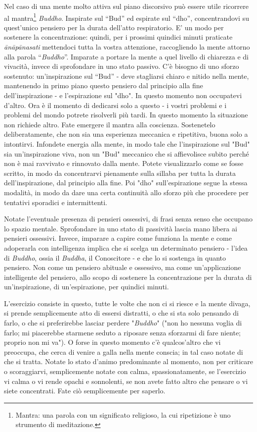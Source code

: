 
Nel caso di una mente molto attiva sul piano discorsivo può essere utile
ricorrere al mantra\footnote{Mantra: una parola con un significato religioso, la cui
ripetizione è uno strumento di meditazione.} \textit{Buddho}. Inspirate sul “Bud” ed espirate
sul “dho”, concentrandovi su quest'unico pensiero per la durata
dell'atto respiratorio. E' un modo per sostenere la concentrazione:
quindi, per i prossimi quindici minuti praticate \textit{ānāpānasati} mettendoci
tutta la vostra attenzione, raccogliendo la mente attorno alla parola
“\textit{Buddho}”. Imparate a portare la mente a quel livello di chiarezza e di
vivacità, invece di sprofondare in uno stato passivo. C'è bisogno di uno
sforzo sostenuto: un'inspirazione sul “Bud” - deve stagliarsi chiaro e
nitido nella mente, mantenendo in primo piano questo pensiero dal
principio alla fine dell'inspirazione - e l'espirazione sul "dho". In
questo momento non occupatevi d'altro. Ora è il momento di dedicarsi
solo a questo - i vostri problemi e i problemi del mondo potrete
risolverli più tardi. In questo momento la situazione non richiede
altro. Fate emergere il mantra alla coscienza. Sostenetelo
deliberatamente, che non sia una esperienza meccanica e ripetitiva,
buona solo a intontirvi. Infondete energia alla mente, in modo tale che
l'inspirazione sul "Bud" sia un'inspirazione viva, non un "Bud"
meccanico che si affievolisce subito perché non è mai ravvivato e
rinnovato dalla mente. Potete visualizzarlo come se fosse scritto, in
modo da concentrarvi pienamente sulla sillaba per tutta la durata
dell'inspirazione, dal principio alla fine. Poi "dho" sull'espirazione
segue la stessa modalità, in modo da dare una certa continuità allo
sforzo più che procedere per tentativi sporadici e intermittenti.

Notate l'eventuale presenza di pensieri ossessivi, di frasi senza senso
che occupano lo spazio mentale. Sprofondare in uno stato di passività
lascia mano libera ai pensieri ossessivi. Invece, imparare a capire come
funziona la mente e come adoperarla con intelligenza implica che si
scelga un determinato pensiero - l'idea di \textit{Buddho}, ossia il \textit{Buddha}, il
Conoscitore - e che lo si sostenga in quanto pensiero. Non come un
pensiero abituale e ossessivo, ma come un'applicazione intelligente del
pensiero, allo scopo di sostenere la concentrazione per la durata di
un'inspirazione, di un'espirazione, per quindici minuti.

L'esercizio consiste in questo, tutte le volte che non ci si riesce e la
mente divaga, si prende semplicemente atto di essersi distratti, o che
si sta solo pensando di farlo, o che si preferirebbe lasciar perdere
"\textit{Buddho}" ("non ho nessuna voglia di farlo; mi piacerebbe starmene seduto
a riposare senza sforzarmi di fare niente; proprio non mi va"). O forse
in questo momento c'è qualcos'altro che vi preoccupa, che cerca di
venire a galla nella mente conscia; in tal caso notate di che si tratta.
Notate lo stato d'animo predominante al momento, non per criticare o
scoraggiarvi, semplicemente notate con calma, spassionatamente, se
l'esercizio vi calma o vi rende opachi e sonnolenti, se non avete fatto
altro che pensare o vi siete concentrati. Fate ciò semplicemente per
saperlo.

